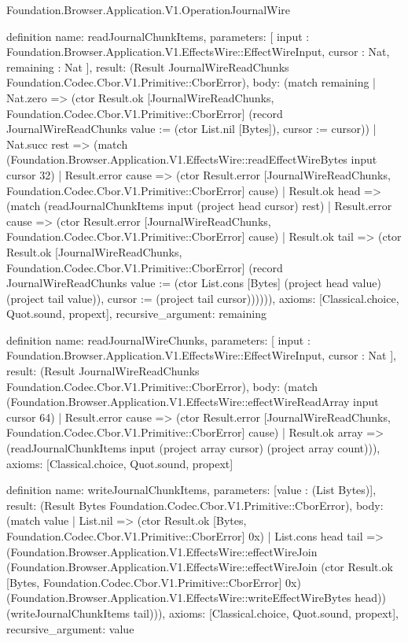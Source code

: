 \begin{lexlean}{Foundation.Browser.Application.V1.OperationJournalWire}
\begin{semanticmodule}
definition{
  name: readJournalChunkItems,
  parameters: [
    input : Foundation.Browser.Application.V1.EffectsWire::EffectWireInput,
    cursor : Nat,
    remaining : Nat
  ],
  result: (Result JournalWireReadChunks Foundation.Codec.Cbor.V1.Primitive::CborError),
  body: (match remaining
    | Nat.zero => (ctor Result.ok [JournalWireReadChunks, Foundation.Codec.Cbor.V1.Primitive::CborError] (record JournalWireReadChunks {value := (ctor List.nil [Bytes]), cursor := cursor}))
    | Nat.succ rest => (match (Foundation.Browser.Application.V1.EffectsWire::readEffectWireBytes input cursor 32)
      | Result.error cause => (ctor Result.error [JournalWireReadChunks, Foundation.Codec.Cbor.V1.Primitive::CborError] cause)
      | Result.ok head => (match (readJournalChunkItems input (project head cursor) rest)
        | Result.error cause => (ctor Result.error [JournalWireReadChunks, Foundation.Codec.Cbor.V1.Primitive::CborError] cause)
        | Result.ok tail => (ctor Result.ok [JournalWireReadChunks, Foundation.Codec.Cbor.V1.Primitive::CborError] (record JournalWireReadChunks {value := (ctor List.cons [Bytes] (project head value) (project tail value)), cursor := (project tail cursor)}))))),
  axioms: [Classical.choice, Quot.sound, propext],
  recursive_argument: remaining
}

definition{
  name: readJournalWireChunks,
  parameters: [
    input : Foundation.Browser.Application.V1.EffectsWire::EffectWireInput,
    cursor : Nat
  ],
  result: (Result JournalWireReadChunks Foundation.Codec.Cbor.V1.Primitive::CborError),
  body: (match (Foundation.Browser.Application.V1.EffectsWire::effectWireReadArray input cursor 64)
    | Result.error cause => (ctor Result.error [JournalWireReadChunks, Foundation.Codec.Cbor.V1.Primitive::CborError] cause)
    | Result.ok array => (readJournalChunkItems input (project array cursor) (project array count))),
  axioms: [Classical.choice, Quot.sound, propext]
}

definition{
  name: writeJournalChunkItems,
  parameters: [value : (List Bytes)],
  result: (Result Bytes Foundation.Codec.Cbor.V1.Primitive::CborError),
  body: (match value
    | List.nil => (ctor Result.ok [Bytes, Foundation.Codec.Cbor.V1.Primitive::CborError] 0x)
    | List.cons head tail => (Foundation.Browser.Application.V1.EffectsWire::effectWireJoin (Foundation.Browser.Application.V1.EffectsWire::effectWireJoin (ctor Result.ok [Bytes, Foundation.Codec.Cbor.V1.Primitive::CborError] 0x) (Foundation.Browser.Application.V1.EffectsWire::writeEffectWireBytes head)) (writeJournalChunkItems tail))),
  axioms: [Classical.choice, Quot.sound, propext],
  recursive_argument: value
}


\end{semanticmodule}
\end{lexlean}
